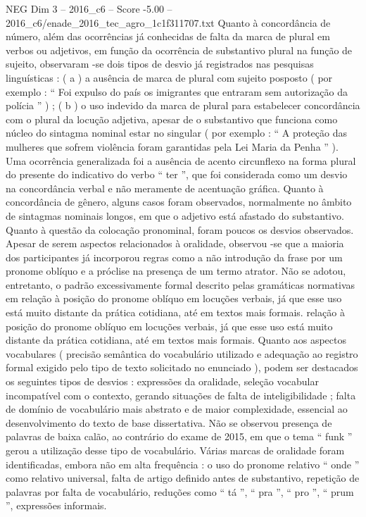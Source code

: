 \begin{textsample}{NEG Dim 3 – 2016\_c6 – Score -5.00 – 2016\_c6/enade\_2016\_tec\_agro\_1c1f311707.txt}
Quanto à concordância de número, além das ocorrências já conhecidas de falta da marca de plural em verbos ou adjetivos, em função da ocorrência de substantivo plural na função de sujeito, observaram -se dois tipos de desvio já registrados nas pesquisas linguísticas : ( a ) a ausência de marca de plural com sujeito posposto ( por exemplo : “ Foi expulso do país os imigrantes que entraram sem autorização da polícia ” ) ; ( b ) o uso indevido da marca de plural para estabelecer concordância com o plural da locução adjetiva, apesar de o substantivo que funciona como núcleo do sintagma nominal estar no singular ( por exemplo : “ A proteção das mulheres que sofrem violência foram garantidas pela Lei Maria da Penha ” ).
Uma ocorrência generalizada foi a ausência de acento circunflexo na forma plural do presente do indicativo do verbo “ ter ”, que foi considerada como um desvio na concordância verbal e não meramente de acentuação gráfica.
Quanto à concordância de gênero, alguns casos foram observados, normalmente no âmbito de sintagmas nominais longos, em que o adjetivo está afastado do substantivo.
Quanto à questão da colocação pronominal, foram poucos os desvios observados.
Apesar de serem aspectos relacionados à oralidade, observou -se que a maioria dos participantes já incorporou regras como a não introdução da frase por um pronome oblíquo e a próclise na presença de um termo atrator.
Não se adotou, entretanto, o padrão excessivamente formal descrito pelas gramáticas normativas em relação à posição do pronome oblíquo em locuções verbais, já que esse uso está muito distante da prática cotidiana, até em textos mais formais. relação à posição do pronome oblíquo em locuções verbais, já que esse uso está muito distante da prática cotidiana, até em textos mais formais.
Quanto aos aspectos vocabulares ( precisão semântica do vocabulário utilizado e adequação ao registro formal exigido pelo tipo de texto solicitado no enunciado ), podem ser destacados os seguintes tipos de desvios : expressões da oralidade, seleção vocabular incompatível com o contexto, gerando situações de falta de inteligibilidade ; falta de domínio de vocabulário mais abstrato e de maior complexidade, essencial ao desenvolvimento do texto de base dissertativa.
Não se observou presença de palavras de baixa calão, ao contrário do exame de 2015, em que o tema “ funk ” gerou a utilização desse tipo de vocabulário.
Várias marcas de oralidade foram identificadas, embora não em alta frequência : o uso do pronome relativo “ onde ” como relativo universal, falta de artigo definido antes de substantivo, repetição de palavras por falta de vocabulário, reduções como “ tá ”, “ pra ”, “ pro ”, “ prum ”, expressões informais.

\end{textsample}
